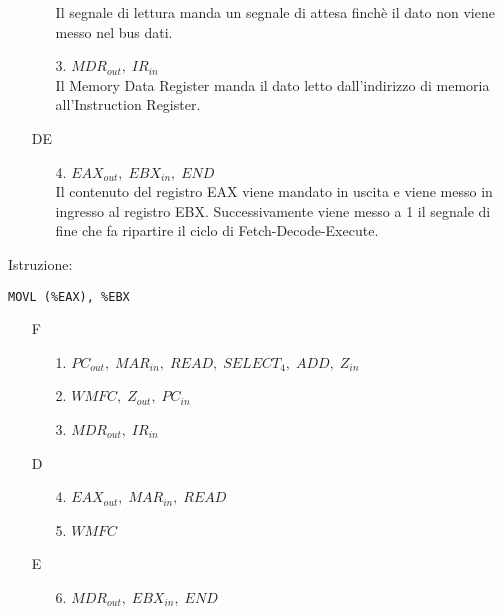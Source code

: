 \documentclass[a4paper]{article}
\theoremstyle{break}
\theoremstyle{break}
\theoremstyle{break}
\theoremstyle{break}
\begin{document}
\begin{example}
\begin{enumerate}
\begin{enumerate}
			            Il segnale di lettura manda un segnale di attesa finchè il dato non viene messo nel bus dati.
			      \item[3.] \( MDR_{out},\; IR_{in} \) \\
			            Il Memory Data Register manda il dato letto dall'indirizzo di memoria all'Instruction Register.
		      \end{enumerate}

		\item[DE]
		      \begin{enumerate}
			      \item[4.] \( EAX_{out},\; EBX_{in},\; END \) \\
			            Il contenuto del registro EAX viene mandato in uscita e viene messo in ingresso
			            al registro EBX. Successivamente viene messo a 1 il segnale di fine che fa
			            ripartire il ciclo di Fetch-Decode-Execute.
		      \end{enumerate}
	\end{enumerate}
\end{example}
\begin{figure}[H]

\end{figure}

\begin{example}
	Istruzione:
	\begin{center}
		\texttt{MOVL (\%EAX), \%EBX}
	\end{center}

	\begin{enumerate}
		\item[F]
		      \begin{enumerate}
			      \item[1.] \( PC_{out},\; MAR_{in},\; READ ,\; SELECT_4,\; ADD,\; Z_{in}\)
			      \item[2.] \( WMFC,\; Z_{out},\; PC_{in}\)
			      \item[3.] \( MDR_{out},\; IR_{in} \)
		      \end{enumerate}
		\item[D]
		      \begin{enumerate}
			      \item[4.] \( EAX_{out},\; MAR_{in},\; READ \)
			      \item[5.] \( WMFC \)
		      \end{enumerate}
		\item[E]
		      \begin{enumerate}
			      \item[6.] \( MDR_{out},\; EBX_{in},\; END \)
		      \end{enumerate}
	\end{enumerate}
\end{example}
\end{document}
